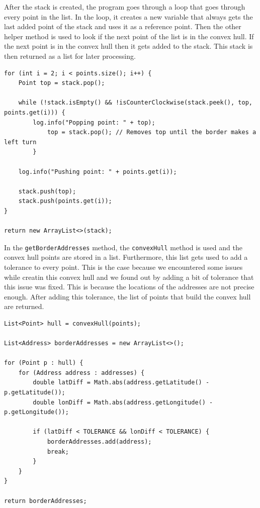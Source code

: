     After the stack is created, the program goes through a loop that goes through every point in the list. In the loop, it creates a new variable that always gets the last added point of the stack and uses it as a reference point. Then the other helper method is used to look if the next point of the list is in the convex hull. If the next point is in the convex hull then it gets added to the stack. This stack is then returned as a list for later processing.
    \lstset{style=mycsharp, caption=Convex Hull Calculation}
    \begin{lstlisting}
for (int i = 2; i < points.size(); i++) {
    Point top = stack.pop();

    while (!stack.isEmpty() && !isCounterClockwise(stack.peek(), top, points.get(i))) {
        log.info("Popping point: " + top);
            top = stack.pop(); // Removes top until the border makes a left turn
        }

    log.info("Pushing point: " + points.get(i));

    stack.push(top);
    stack.push(points.get(i));
}

return new ArrayList<>(stack);
    \end{lstlisting}

    In the \texttt{getBorderAddresses} method, the \texttt{convexHull} method is used and the convex hull points are stored in a list. Furthermore, this list gets used to add a tolerance to every point. This is the case because we encountered some issues while creatin this convex hull and we found out by adding a bit of tolerance that this issue was fixed. This is because the locations of the addresses are not precise enough. After adding this tolerance, the list of points that build the convex hull are returned.
    \lstset{style=mycsharp, caption=Lowest Point Calculation}
    \begin{lstlisting}
List<Point> hull = convexHull(points);

List<Address> borderAddresses = new ArrayList<>();
        
for (Point p : hull) {
    for (Address address : addresses) {
        double latDiff = Math.abs(address.getLatitude() - p.getLatitude());
        double lonDiff = Math.abs(address.getLongitude() - p.getLongitude());
        
        if (latDiff < TOLERANCE && lonDiff < TOLERANCE) {
            borderAddresses.add(address);
            break;
        }
    }
}
        
return borderAddresses;
    \end{lstlisting}

